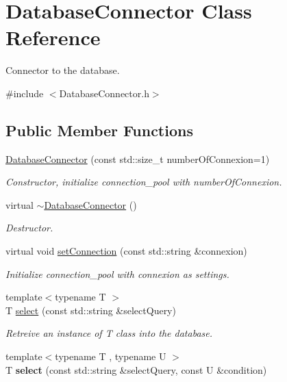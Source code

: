 \hypertarget{class_database_connector}{\section{Database\-Connector Class Reference}
\label{class_database_connector}
}


Connector to the database.  




{\ttfamily \#include $<$Database\-Connector.\-h$>$}

\subsection*{Public Member Functions}
\begin{DoxyCompactItemize}
\item 
\hyperlink{class_database_connector_a8807b25ac1173dcc8f75d9e872843d2c}{Database\-Connector} (const std\-::size\-\_\-t number\-Of\-Connexion=1)
\begin{DoxyCompactList}\small\item\em Constructor, initialize connection\-\_\-pool with number\-Of\-Connexion. \end{DoxyCompactList}\item 
\hypertarget{class_database_connector_a4312f4426fbfd8519bea54c919c27c6a}{virtual \hyperlink{class_database_connector_a4312f4426fbfd8519bea54c919c27c6a}{$\sim$\-Database\-Connector} ()}\label{class_database_connector_a4312f4426fbfd8519bea54c919c27c6a}

\begin{DoxyCompactList}\small\item\em Destructor. \end{DoxyCompactList}\item 
virtual void \hyperlink{class_database_connector_ad016f789f03f9822363582f7774295a4}{set\-Connection} (const std\-::string \&connexion)
\begin{DoxyCompactList}\small\item\em Initialize connection\-\_\-pool with connexion as settings. \end{DoxyCompactList}\item 
{\footnotesize template$<$typename T $>$ }\\T \hyperlink{class_database_connector_aed80d4653583db6545cf1b22661b7119}{select} (const std\-::string \&select\-Query)
\begin{DoxyCompactList}\small\item\em Retreive an instance of T class into the database. \end{DoxyCompactList}\item 
\hypertarget{class_database_connector_a45cdbb802a2619aa938a5f82a1ea9370}{{\footnotesize template$<$typename T , typename U $>$ }\\T {\bfseries select} (const std\-::string \&select\-Query, const U \&condition)}\label{class_database_connector_a45cdbb802a2619aa938a5f82a1ea9370}


\end{DoxyCompactItemize}
